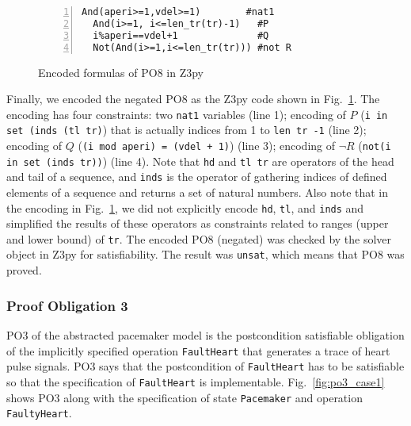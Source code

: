 \begin{figure}[t]
\begin{center}
\begin{mdframed}[roundcorner=5pt,shadow=true]
\begin{Verbatim}[fontsize=\small,numbers=left]
  And(aperi>=1,vdel>=1)        #nat1
  And(i>=1, i<=len_tr(tr)-1)   #P
  i%aperi==vdel+1              #Q
  Not(And(i>=1,i<=len_tr(tr))) #not R
\end{Verbatim}
\end{mdframed}
\vspace{-10pt}
\caption{Encoded formulas of PO8 in Z3py}
\label{fig:po8_encoded_case1}
\end{center}
\end{figure}

Finally, we encoded the negated PO8 as the Z3py code shown in Fig.~\ref{fig:po8_encoded_case1}. The encoding has four constraints: two {\tt nat1} variables (line 1); encoding of $P$ ({\tt i in set (inds (tl tr)}) that is actually indices from 1 to {\tt len tr -1} (line 2); encoding of $Q$ ({\tt (i mod aperi) = (vdel + 1)}) (line 3); encoding of $\neg R$ ({\tt not(i in set (inds tr))}) (line 4). Note that {\tt hd} and {\tt tl tr} are operators of the head and tail of a sequence, and {\tt inds} is the operator of gathering indices of defined elements of a sequence and returns a set of natural numbers. Also note that in the encoding in Fig.~\ref{fig:po8_encoded_case1}, we did not explicitly encode {\tt hd}, {\tt tl}, and {\tt inds} and simplified the results of these operators as constraints related to ranges (upper and lower bound) of {\tt tr}. The encoded PO8 (negated) was checked by the solver object in Z3py for satisfiability. The result was {\tt unsat}, which means that PO8 was proved.


\subsubsection{Proof Obligation 3}

PO3 of the abstracted pacemaker model is the postcondition satisfiable obligation of the implicitly specified operation {\tt FaultHeart} that generates a trace of heart pulse signals. PO3 says that the postcondition of {\tt FaultHeart} has to be satisfiable so that the specification of {\tt FaultHeart} is implementable. Fig.~\ref{fig:po3_case1} shows PO3 along with the specification of state {\tt Pacemaker} and operation {\tt FaultyHeart}.

